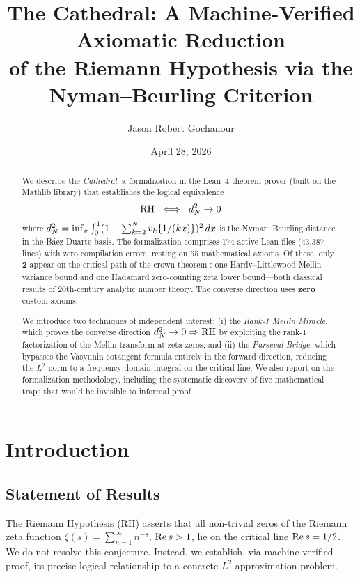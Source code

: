 \documentclass[11pt,a4paper]{article}
\title{%
  The Cathedral: A Machine-Verified Axiomatic Reduction\\
  of the Riemann Hypothesis via the Nyman--Beurling Criterion%
}
\author{
  Jason Robert Gochanour
}
\date{April 28, 2026}
\begin{document}
\maketitle

\begin{abstract}
We describe the \emph{Cathedral}, a formalization in the Lean~4 theorem
prover (built on the Mathlib library) that establishes the logical
equivalence
\[
  \mathrm{RH} \;\iff\; d_N^2 \to 0
\]
where $d_N^2 = \inf_{v} \int_0^1 (1 - \sum_{k=2}^N v_k \{1/(kx)\})^2\,dx$
is the Nyman--Beurling distance in the B\'aez-Duarte basis. The
formalization comprises 174 active Lean files (43{,}387 lines) with zero
compilation errors, resting on 55 mathematical axioms. Of these, only
\textbf{2} appear on the critical path of the crown theorem
: one Hardy--Littlewood Mellin variance
bound and one Hadamard zero-counting zeta lower bound---both classical
results of 20th-century analytic number theory.
The converse direction uses \textbf{zero} custom axioms.

We introduce two techniques of independent interest: (i) the
\emph{Rank-1 Mellin Miracle}, which proves the converse direction
$d_N^2 \to 0 \Rightarrow \mathrm{RH}$ by exploiting the rank-1 factorization
of the Mellin transform at zeta zeros; and (ii) the \emph{Parseval Bridge},
which bypasses the Vasyunin cotangent formula entirely in the forward
direction, reducing the $L^2$ norm to a frequency-domain integral on the
critical line. We also report on the formalization methodology,
including the systematic discovery of five mathematical traps that
would be invisible to informal proof.
\end{abstract}

\tableofcontents

\section{Introduction}

\subsection{Statement of Results}

The Riemann Hypothesis (RH) asserts that all non-trivial zeros of the
Riemann zeta function $\zeta(s) = \sum_{n=1}^\infty n^{-s}$, $\operatorname{Re} s > 1$,
lie on the critical line $\operatorname{Re} s = 1/2$. We do not resolve this
conjecture. Instead, we establish, via machine-verified proof, its
precise logical relationship to a concrete $L^2$ approximation problem.
\end{document}
